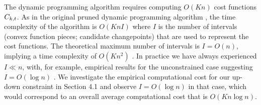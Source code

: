 \documentclass[aoas]{imsart}
\begin{document}
The dynamic programming algorithm requires computing $O(Kn)$ cost
functions $C_{k,t}$. As in the original pruned dynamic programming
algorithm \citep{pruned-dp}, the time complexity of the algorithm is
$O(K n I)$ where $I$ is the number of intervals (convex function
pieces; candidate changepoints) that are used to represent the cost
functions. The theoretical maximum number of intervals is $I=O(n)$,
implying a time complexity of $O(K n^2)$
\citep{pruned-dp-new}. 
In practice we have always experienced $I\ll n$, with, for example,
empirical results for the unconstrained case suggesting $I=O(\log
n)$ \citep{fpop}. We investigate the empirical computational cost for our up-down
constraint in Section 4.1 and observe $I=O(\log n)$ in that case,
which would correspond to an overall average computational cost that is
$O(Kn\log n)$.
\end{document}
